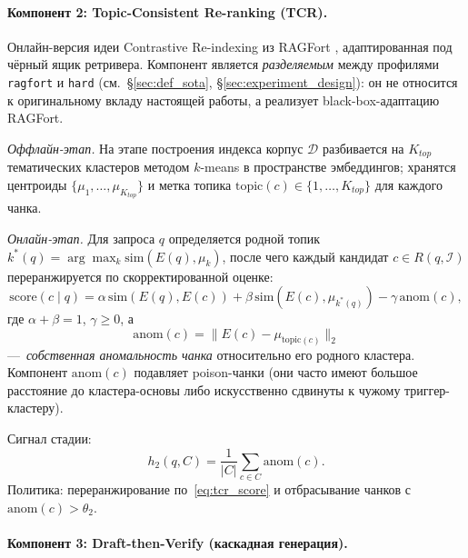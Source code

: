 \documentclass[12pt, a4paper]{article}
\theoremstyle{definition}
\theoremstyle{remark}
\begin{document}
\paragraph{Компонент 2: Topic-Consistent Re-ranking (TCR).}

Онлайн-версия идеи Contrastive Re-indexing из RAGFort \cite{RAGFort2025}, адаптированная под чёрный ящик ретривера. Компонент является \textit{разделяемым} между профилями \texttt{ragfort} и \texttt{hard} (см.~\S\ref{sec:def_sota}, \S\ref{sec:experiment_design}): он не относится к оригинальному вкладу настоящей работы, а реализует black-box-адаптацию RAGFort.

\textit{Оффлайн-этап.} На этапе построения индекса корпус $\mathcal{D}$ разбивается на $K_{top}$ тематических кластеров методом $k$-means в пространстве эмбеддингов; хранятся центроиды $\{\mu_1, \dots, \mu_{K_{top}}\}$ и метка топика $\mathrm{topic}(c) \in \{1, \dots, K_{top}\}$ для каждого чанка.

\textit{Онлайн-этап.} Для запроса $q$ определяется родной топик $k^*(q) = \arg\max_k \mathrm{sim}(E(q), \mu_k)$, после чего каждый кандидат $c \in R(q, \mathcal{I})$ переранжируется по скорректированной оценке:
\begin{equation}
    \label{eq:tcr_score}
    \mathrm{score}(c \mid q) = \alpha\,\mathrm{sim}(E(q), E(c)) + \beta\,\mathrm{sim}(E(c), \mu_{k^*(q)}) - \gamma\,\mathrm{anom}(c),
\end{equation}
где $\alpha + \beta = 1$, $\gamma \ge 0$, а
\begin{equation}
    \mathrm{anom}(c) = \bigl\lVert E(c) - \mu_{\mathrm{topic}(c)} \bigr\rVert_2
\end{equation}
---~\textit{собственная аномальность чанка} относительно его родного кластера. Компонент $\mathrm{anom}(c)$ подавляет poison-чанки (они часто имеют большое расстояние до кластера-основы либо искусственно сдвинуты к чужому триггер-кластеру).

Сигнал стадии:
\begin{equation}
    h_2(q, C) = \frac{1}{|C|} \sum_{c \in C} \mathrm{anom}(c).
\end{equation}
Политика: переранжирование по~\eqref{eq:tcr_score} и отбрасывание чанков с $\mathrm{anom}(c) > \theta_2$.

\paragraph{Компонент 3: Draft-then-Verify (каскадная генерация).}
\end{document}
